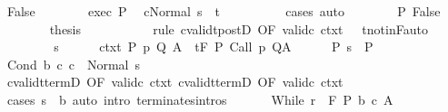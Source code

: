\begin{isabellebody}
\ False\isanewline
\ \ \ \ \ \ \isamarkupfalse%
\ exec\ P\ \isamarkupfalse%
\ {\isachardoublequoteopen}{\isasymGamma}{\isasymturnstile}{\isasymlangle}c{}{\isacharcomma}Normal\ s{\isasymrangle}\ {\isasymRightarrow}\ t{\isachardoublequoteclose}\isanewline
\ \ \ \ \ \ \ \ \isamarkupfalse%
\ cases\ auto\isanewline
\ \ \ \ \ \ \isamarkupfalse%
\ P\ False\ \isanewline
\ \ \ \ \ \ \isamarkupfalse%
\ {\isacharquery}thesis\isanewline
\ \ \ \ \ \ \ \ \isamarkupfalse%
\ {\isacharminus}\ {\isacharparenleft}rule\ cvalidt{\isacharunderscore}postD\ {\isacharbrackleft}OF\ valid{\isacharunderscore}c{}\ ctxt\ {\isacharunderscore}\ {\isacharunderscore}\ t{\isacharunderscore}notin{\isacharunderscore}F{\isacharbrackright}{\isacharcomma}auto{\isacharparenright}\isanewline
\ \ \ \ \isamarkupfalse%
\isanewline
\ \ \isamarkupfalse%
\isanewline
\ \ \ \ \isamarkupfalse%
\ s\isanewline
\ \ \ \ \isamarkupfalse%
\ ctxt{\isacharcolon}\ {\isachardoublequoteopen}{\isasymforall}{\isacharparenleft}P{\isacharcomma}\ p{\isacharcomma}\ Q{\isacharcomma}\ A{\isacharparenright}{\isasymin}{\isasymTheta}{\isachardot}\ {\isasymGamma}\ {\isasymTurnstile}\isactrlsub t\isactrlbsub {\isacharslash}F\isactrlesub \ P\ {\isacharparenleft}Call\ p{\isacharparenright}\ Q{\isacharcomma}A{\isachardoublequoteclose}\isanewline
\ \ \ \ \isamarkupfalse%
\ P{\isacharcolon}\ {\isachardoublequoteopen}s\ {\isasymin}\ P{\isachardoublequoteclose}\isanewline
\ \ \ \ \isamarkupfalse%
\ {\isachardoublequoteopen}{\isasymGamma}{\isasymturnstile}Cond\ b\ c{}\ c{}\ {\isasymdown}\ Normal\ s{\isachardoublequoteclose}\isanewline
\ \ \ \ \ \ \isamarkupfalse%
\ cvalidt{\isacharunderscore}termD\ {\isacharbrackleft}OF\ valid{\isacharunderscore}c{}\ ctxt{\isacharbrackright}\ cvalidt{\isacharunderscore}termD\ {\isacharbrackleft}OF\ valid{\isacharunderscore}c{}\ ctxt{\isacharbrackright}\isanewline
\ \ \ \ \ \ \isamarkupfalse%
\ {\isacharparenleft}cases\ {\isachardoublequoteopen}s\ {\isasymin}\ b{\isachardoublequoteclose}{\isacharparenright}\ {\isacharparenleft}auto\ intro{\isacharcolon}\ terminates{\isachardot}intros{\isacharparenright}\isanewline
\ \ \isamarkupfalse%
\isanewline
{}\isamarkupfalse%
\isanewline
\ \ \isamarkupfalse%
\ {\isacharparenleft}While\ r\ {\isasymTheta}\ F\ P\ b\ c\ A{\isacharparenright}\isanewline

\end{isabellebody}
